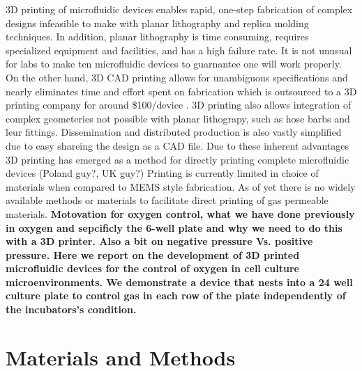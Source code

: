 3D printing of microfluidic devices enables rapid, one-step fabrication of complex designs infeasible to make with planar lithography and replica molding techniques.
In addition, planar lithography is time consuming, requires specialized equipment and facilities, and has a high failure rate.
It is not unusual for labs to make ten microfluidic devices to guarnantee one will work properly.
On the other hand, 3D CAD printing allows for unambiguous specifications and nearly eliminates time and effort spent on fabrication which is outsourced to a 3D printing company for around \$100/device \cite{Au2014,Chen2014}.
3D printing also allows integration of complex geometeries not possible with planar lithograpy, such as hose barbs and leur fittings.
Dissemination and distributed production is also vastly simplified due to easy shareing the design as a CAD file.
Due to these inherent advantages 3D printing has emerged as a method for directly printing complete microfluidic devices \cite{Au2014, Chen2014} (Poland guy?, UK guy?) 
Printing is currently limited in choice of materials when compared to MEMS style fabrication. 
As of yet there is no widely available methods or materials to facilitate direct printing of gas permeable materials.
\bf{Motovation for oxygen control, what we have done previously in oxygen and sepcificly the 6-well plate and why we need to do this with a 3D printer. Also a bit on negative pressure Vs. positive pressure.}
Here we report on the development of 3D printed microfluidic devices for the control of oxygen in cell culture microenvironments.
We demonstrate a device that nests into a 24 well culture plate to control gas in each row of the plate independently of the incubators's condition.

\section*{Materials and Methods}


